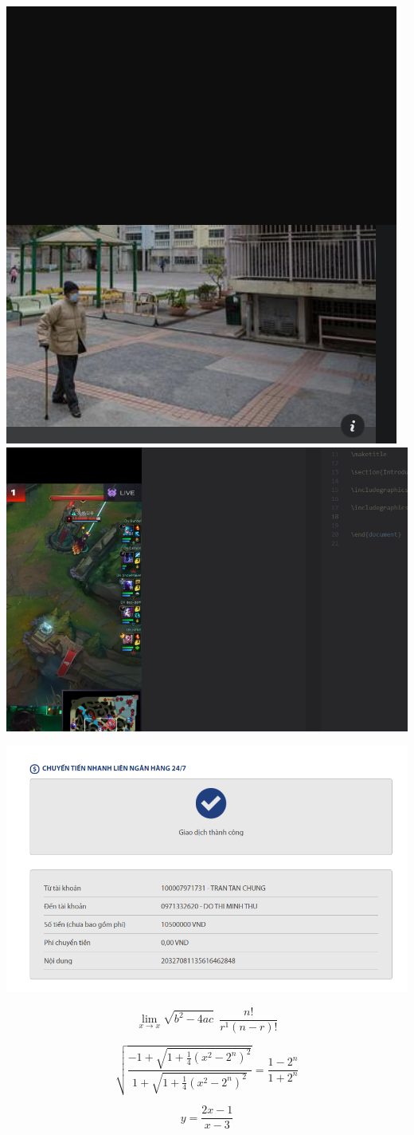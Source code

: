 \documentclass{article}
\begin{document}
\includegraphics[scale=1]{AykQ6}
\includegraphics[scale=1]{MHpu2}

\includegraphics[scale=1]{Screenshot 2022-02-16 085025}

\[\operatorname*{lim}_{x\rightarrow x}\sqrt{b^{2}-4a c}\ \ \frac{n!}{r^{1}(n-r)!}\]

\[{\sqrt{\frac{-1+{\sqrt{1+{\frac{1}{4}}(x^{2}-2^{n})^{2}}}}{1+{\sqrt{1+{\frac{1}{4}}(x^{2}-2^{n})^{2}}}}}={\frac{1-2^{n}}{1+2^{n}}}}\]

\[y={\frac{2x-1}{x-3}}\]
\end{document}
